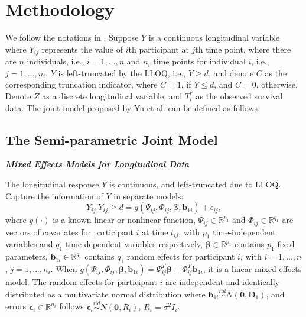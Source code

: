 \section{Methodology}
\label{sec:method}

We follow the notations in \cite{yu2018joint}. Suppose $Y$ is a continuous longitudinal variable where $Y_{ij}$ represents the value of $i$th participant at $j$th time point, where there are $n$ individuals, i.e., $i=1,\dots,n$ and $n_i$ time points for individual $i$, i.e., $j=1,\dots,n_i$. $Y$ is left-truncated by the LLOQ, i.e., $Y\geq d$, and denote $C$ as the corresponding truncation indicator, where $C=1$, if $Y\leq d$, and $C=0$, otherwise. Denote $Z$ as a discrete longitudinal variable, and $T_i^{\ast}$ as the observed survival data. The joint model proposed by Yu et al. \cite{yu2018joint} can be defined as follows.


\subsection{The Semi-parametric Joint Model}
\label{sec:2.1}

\vspace{2mm}
\noindent \textbf{\textit{Mixed Effects Models for Longitudinal Data}}
\vspace{2mm}

The longitudinal response $Y$ is continuous, and left-truncated due to LLOQ.
Capture the information of $Y$ in separate models:
\begin{equation}
    Y_{ij}|Y_{ij}\geq d = g({\Psi}_{ij}, {\Phi}_{ij}, \boldsymbol{\beta}, \boldsymbol{b}_{1i}) + \epsilon_{ij},
\end{equation}
where $g(\cdot)$ is a known linear or nonlinear function, ${\Psi}_{ij}\in \mathbb{R}^{p_1}$ and ${\Phi}_{ij}\in \mathbb{R}^{q_1}$ are vectors of covariates for participant $i$ at time $t_{ij}$, with $p_1$ time-independent variables and $q_1$ time-dependent variables respectively, $\boldsymbol{\beta}\in \mathbb{R}^{p_1}$ contains $p_1$ fixed parameters, $\boldsymbol{b}_{1i}\in \mathbb{R}^{q_1}$ contains $q_1$ random effects for participant $i$, with $i=1,...,n$, $j=1,...,n_i$. When $g({\Psi}_{ij}, {\Phi}_{ij}, \boldsymbol{\beta}, \boldsymbol{b}_{1i}) = {\Psi}_{ij}^T \boldsymbol{\beta} + {\Phi}_{ij}^T \boldsymbol{b}_{1i}$, it is a linear mixed effects model. The random effects for participant $i$ are independent and identically distributed as a multivariate normal distribution where $\boldsymbol{b}_{1i}\stackrel{iid}{\sim} N(\boldsymbol{0}, \boldsymbol{D}_1)$, and errors $\boldsymbol{\epsilon}_i\in \mathbb{R}^{n_i}$ follows $\boldsymbol{\epsilon}_{i}\stackrel{iid}{\sim} N(\boldsymbol{0}, {R}_i)$, ${R}_i=\sigma^2 {I}_i$.


